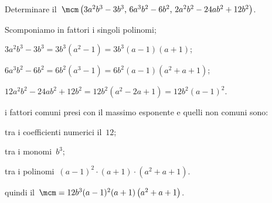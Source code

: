 \begin{exrig}
 \begin{esempio}
Determinare il~$\mcm\left(3a^{2}b^{3}-3b^{3}\text{,~}6a^{3}b^{2}-6b^{2}\text{,~}2a^{2}b^{2}-24ab^{2}+12b^{2}\right)$.
 \begin{itemize*}
 \item Scomponiamo in fattori i singoli polinomi;
  \begin{itemize*}
  \item $3a^{2}b^{3}-3b^{3}=3b^{3}\left(a^{2}-1\right)=3b^{3}(a-1)(a+1)$;
  \item $6a^{3}b^{2}-6b^{2}=6b^{2}\left(a^{3}-1\right)=6b^{2}(a-1)\left(a^{2}+a+1\right)$;
  \item $12a^{2}b^{2}-24ab^{2}+12b^{2}=12b^{2}\left(a^{2}-2a+1\right)=12b^{2}(a-1)^{2}$.
  \end{itemize*}
 \item i fattori comuni presi con il massimo esponente e quelli non comuni sono:
  \begin{itemize*}
  \item tra i coefficienti numerici il~$12$;
  \item tra i monomi~$b^{3}$;
  \item tra i polinomi~$(a-1)^{2}\cdot (a+1)\cdot \left(a^{2}+a+1\right)$.
  \end{itemize*}
 \item quindi il~$\mcm=12b^{3}(a-1)^{2}(a+1)\left(a^{2}+a+1\right)$.
 \end{itemize*}
 \end{esempio}
\end{exrig}

\ovalbox{\risolvii \ref{ese:18.1}, \ref{ese:18.2}, \ref{ese:18.3}, \ref{ese:18.4}, \ref{ese:18.5}, \ref{ese:18.6}, \ref{ese:18.7}, \ref{ese:18.8}, \ref{ese:18.9}, \ref{ese:18.10}, \ref{ese:18.11}}

\newpage

\cleardoublepage
